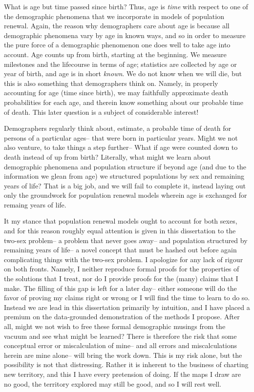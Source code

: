 What is age but time passed since birth? Thus, age is \textit{time} with respect
to one of the demographic phenomena that we incorporate in models of population
renewal. Again, the reason why demographers care about age is because all
demographic phenomena vary by age in known ways, and so in order to measure the
pure force of a demographic phenomenon one does well to take age into account.
Age counts up from birth, starting at the beginning. We measure milestones and
the lifecourse in terms of age; statistics are collected by age or year of
birth, and age is in short \textit{known}. We do not know when we will die, but
this is also something that demographers think on. Namely, in properly
accounting for age (time since birth), we may faithfully approximate death
probabilities for each age, and therein know something about our probable time
of death. This later question is a subject of considerable interest!

Demographers regularly think about, estimate, a probable time of
death for persons of a particular ages-- that were born in particular years.
Might we not also venture, to take things a step further-- What if age were 
counted down to death instead of up
from birth? Literally, what might we learn about demographic phenomena and
population structure if beyond age (and due to the information we glean from
age) we structured populations by sex and remaining years of life? That is a 
big job, and we will fail to complete it, instead laying out only the groundwork
for population renewal models wherein age is exchanged for remaing years of life.

It my stance that population renewal models ought to account for both sexes, and
for this reason roughly equal attention is given in this dissertation to the
two-sex problem-- a problem that never goes away-- and population structured
by remaining years of life-- a novel concept that must be hashed out before
again complicating things with the two-sex problem. I apologize for any lack of
rigour on both fronts. Namely, I neither reproduce formal proofs for the
properties of the solutions that I treat, nor do I provide proofs for the
(many) claims that I make. The filling of this gap is left for a later day--
either someone will do the favor of proving my claims right or wrong or I
will find the time to learn to do so. Instead we are lead in this dissertation
primarily by intuition, and I have placed a premium on the
data-grounded demonstration of the methods I propose. After all, might we not
wish to free these formal demographic musings from the vacuum and see what might
be learned? There is therefore the risk that some conceptual error or
miscalculation of mine-- and all errors and miscalculations herein are mine
alone-- will bring the work down. This is my risk alone, but the possibility is
not that distressing. Rather it is inherent to the business of charting new
territory, and this I have every pretension of doing. If the maps I draw are no
good, the territory explored may still be good, and so I will rest well.

